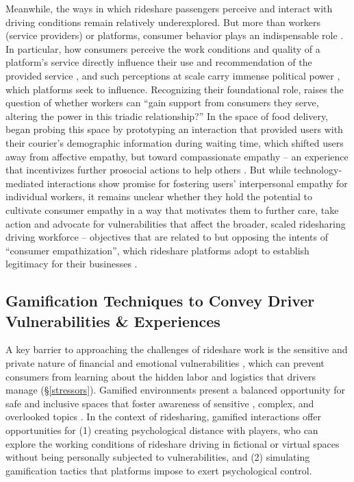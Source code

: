 Meanwhile, the ways in which rideshare passengers perceive and interact with driving conditions remain relatively underexplored. But more than workers (service providers) or platforms, consumer behavior plays an indispensable role \cite{triangle}. In particular, how consumers perceive the work conditions and quality of a platform's service directly influence their use and recommendation of the provided service \cite{role}, and such perceptions at scale carry immense political power \cite{sceptics}, which platforms seek to influence. Recognizing their foundational role, \citet{triangle} raises the question of whether workers can ``gain support from consumers they serve, altering the power in this triadic relationship?'' In the space of food delivery, \citet{fastdrink} began probing this space by prototyping an interaction that provided users with their courier's demographic information during waiting time, which shifted users away from affective empathy, but toward compassionate empathy -- an experience that incentivizes further prosocial actions to help others \cite{compassion}. 
But while technology-mediated interactions show promise for fostering users' interpersonal empathy for individual workers, it remains unclear whether they hold the potential to cultivate consumer empathy in a way that motivates them to further care, take action and advocate for vulnerabilities that affect the broader, scaled ridesharing driving workforce -- objectives that are related to but opposing the intents of ``consumer empathization'', which rideshare platforms adopt to establish legitimacy for their businesses \cite{legitimize}.



\subsection{Gamification Techniques to Convey Driver Vulnerabilities \& Experiences}
A key barrier to approaching the challenges of rideshare work is the sensitive and private nature of financial and emotional vulnerabilities \cite{sannondisabilities}, which can prevent consumers from learning about the hidden labor and logistics that drivers manage (\S \ref{stressors}).
Gamified environments present a balanced opportunity for safe and inclusive spaces that foster awareness of sensitive \cite{kaufman2stealth, provotypes}, complex, and overlooked topics \cite{seat}. 
In the context of ridesharing, gamified interactions offer opportunities for (1) creating psychological distance with players, who can explore the working conditions of rideshare driving in fictional or virtual spaces without being personally subjected to vulnerabilities, and (2) simulating gamification tactics that platforms impose to exert psychological control.

